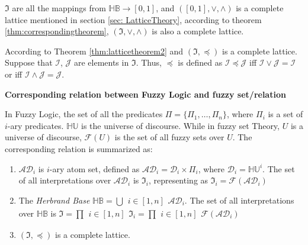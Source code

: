 \documentclass[Thesis.tex]{subfiles}
\begin{document}
$\mathfrak{I}$ are all the mappings from $\mathbb{HB} \rightarrow [0,1]$, and $([0,1],\vee,\wedge)$ is a complete lattice mentioned in section \ref{sec: LatticeTheory},  according to theorem \ref{thm:correspondingtheorem}, $(\mathfrak{I},\vee,\wedge)$ is also a complete lattice. 

According to Theorem \ref{thm:latticetheorem2} and $(\mathfrak{I},\preceq)$ is a complete lattice. Suppose that $\mathcal{I}$, $\mathcal{J}$ are elements in $\mathfrak{I}$. 
Thus, $\preceq$ is defined as $\mathcal{I} \preceq \mathcal{J}$ iff $\mathcal{I} \vee \mathcal{J} = \mathcal{I}$ or iff $\mathcal{I} \wedge \mathcal{J} = \mathcal{J}$.


\begin{thm} \textbf{Corresponding relation between Fuzzy Logic and fuzzy set/relation}

In Fuzzy Logic, the set of all the predicates $\Pi=\{\Pi_1, \dots, \Pi_n\}$, where $\Pi_i$ is a set of $i$-ary predicates. $\mathbb{HU}$ is the universe of discourse. While in fuzzy set Theory, $U$ is a universe of discourse, $\mathcal{F}(U)$ is the set of all fuzzy sets over $U$. The corresponding relation is summarized as:

\begin{enumerate}

\item  $\mathcal{AD}_i$  is $i$-ary atom set, defined as $\mathcal{AD}_i = \mathcal{D}_i \times \Pi_i$, where $\mathcal{D}_i=\mathbb{HU}^{i}$. The set of all interpretations over $\mathcal{AD}_i$ is $\mathfrak{I}_i$, representing as $\mathfrak{I}_i = \mathcal{F}(\mathcal{AD}_i)$

\item The \textit{Herbrand Base} $\mathbb{HB} = \bigcup{\substack{i \in [1,n]}}\mathcal{AD}_i$. The set of all interpretations over $\mathbb{HB}$ is $\mathfrak{I} = \prod{\substack{i \in [1,n]}}\mathfrak{I}_i=\prod{\substack{i \in [1,n]}}\mathcal{F}(\mathcal{AD}_i)$

\item $(\mathfrak{I},\preceq)$ is a complete lattice.

\end{enumerate}

\end{thm} 
\end{document}
